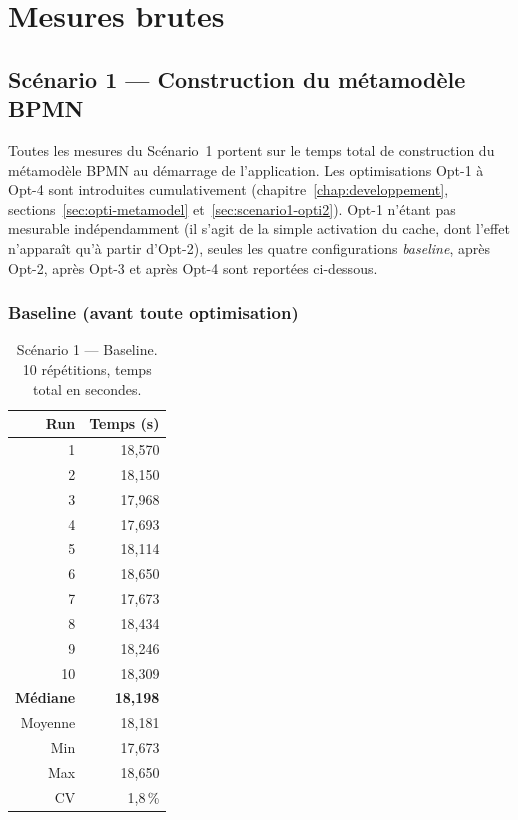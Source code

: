 \appendix
\chapter{Mesures brutes}
\label{ann:mesures}

\section{Scénario 1 — Construction du métamodèle BPMN}
\label{ann:mesures-s1-a}

Toutes les mesures du Scénario~1 portent sur le temps total de construction
du métamodèle BPMN au démarrage de l'application. Les optimisations Opt-1
à Opt-4 sont introduites cumulativement (chapitre~\ref{chap:developpement},
sections~\ref{sec:opti-metamodel} et~\ref{sec:scenario1-opti2}). Opt-1
n'étant pas mesurable indépendamment (il s'agit de la simple activation
du cache, dont l'effet n'apparaît qu'à partir d'Opt-2), seules les
quatre configurations \emph{baseline}, après Opt-2, après Opt-3 et après
Opt-4 sont reportées ci-dessous.

\subsection*{Baseline (avant toute optimisation)}

\begin{table}[h]
\centering
\caption{Scénario 1 --- Baseline. 10 répétitions, temps total en secondes.}
\begin{tabular}{rr}
\hline
\textbf{Run} & \textbf{Temps (s)} \\
\hline
1  & 18,570 \\
2  & 18,150 \\
3  & 17,968 \\
4  & 17,693 \\
5  & 18,114 \\
6  & 18,650 \\
7  & 17,673 \\
8  & 18,434 \\
9  & 18,246 \\
10 & 18,309 \\
\hline
\textbf{Médiane} & \textbf{18,198} \\
Moyenne          & 18,181 \\
Min              & 17,673 \\
Max              & 18,650 \\
CV               & 1,8\,\% \\
\hline
\end{tabular}
\end{table}

